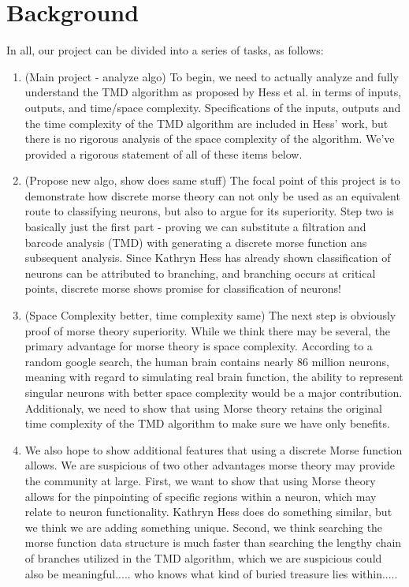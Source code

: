 \documentclass[11pt]{article}
\begin{document}
\maketitle
\section*{Background}
In all, our project can be divided into a series of tasks, as follows:
\begin{enumerate}
	\item (Main project - analyze algo) To begin, we need to actually analyze and fully understand the TMD algorithm
		as proposed by Hess et al. in terms of inputs, outputs, and time/space complexity. 
		Specifications of the inputs, outputs and the time complexity of the TMD algorithm are
		included in Hess' work, but there is no rigorous analysis of the space complexity of
		the algorithm. We've provided a rigorous statement of all of these items below.
	\item (Propose new algo, show does same stuff) The focal point of this project is to demonstrate how discrete morse theory can not only be used
		as an equivalent route to classifying neurons, but also to argue for its superiority. 
		Step two is basically just the first part - proving we can substitute a filtration and
		barcode analysis (TMD) with generating a discrete morse function ans subsequent analysis.
		Since Kathryn Hess has already shown classification of neurons can be attributed to branching,
		and branching occurs at critical points, discrete morse shows promise for classification of neurons!
		
	\item (Space Complexity better, time complexity same) The next step is obviously proof of morse theory superiority. While we think there may be
		several, the primary advantage for morse theory is space complexity. According to a random
		google search, the human brain contains nearly 86 million neurons, meaning with regard to 
		simulating real brain function, the ability to represent singular neurons with better space
		complexity would be a major contribution. Additionaly, we need to show that using Morse theory
		retains the original time complexity of the TMD algorithm to make sure we have only benefits.
	\item We also hope to show additional features that using a discrete Morse function
		allows. We are suspicious of two other advantages morse theory may provide the community at large.
		First, we want to show that using Morse theory allows for the pinpointing
		of specific regions within a neuron, which may relate to neuron functionality.
		Kathryn Hess does do something similar, but we think we are adding something unique.
		Second, we think searching the morse function data structure is much faster than searching
		the lengthy chain of branches utilized in the TMD algorithm, which we are suspicious could 
		also be meaningful..... who knows what kind of buried treasure lies within.....
\end{enumerate}
\end{document}
